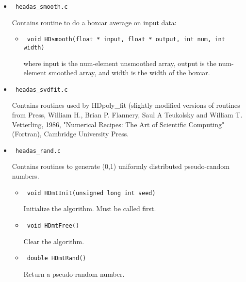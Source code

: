 \documentclass[11pt]{book}
\begin{document}
\begin{itemize}
\item            \begin{verbatim} headas_smooth.c \end{verbatim}
            Contains routine to do a boxcar average on input data:
	    \begin{itemize}
            \item  \begin{verbatim} void HDsmooth(float * input, float * output, int num, int width) \end{verbatim}
	          where input is the num-element unsmoothed array,
	          output is the num-element smoothed array, and width
	          is the width of the boxcar.
            \end{itemize}

\item            \begin{verbatim} headas_svdfit.c \end{verbatim}
            Contains routines used by HDpoly\_fit (slightly modified
            versions of routines from Press, William H., Brian P. Flannery,
            Saul A Teukolsky and William T. Vetterling, 1986,
            "Numerical Recipes: The Art of Scientific Computing" (Fortran),
            Cambridge University Press.

\item	         \begin{verbatim} headas_rand.c \end{verbatim}
	    Contains routines to generate (0,1) uniformly distributed
	    pseudo-random numbers.
            \begin{itemize}

	    \item      \begin{verbatim} void HDmtInit(unsigned long int seed) \end{verbatim} 
		  Initialize the algorithm. Must be called first.

	    \item      \begin{verbatim} void HDmtFree() \end{verbatim} 
		  Clear the algorithm.

	    \item      \begin{verbatim} double HDmtRand() \end{verbatim} 
		  Return a pseudo-random number.
            \end{itemize}
\end{itemize}
\end{document}
